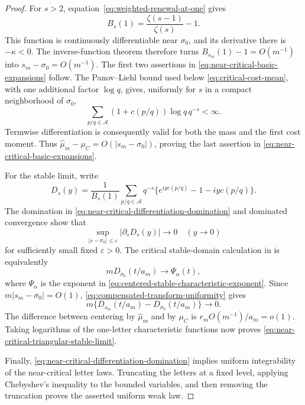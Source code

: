 \begin{proof}
For \(s>2\), equation~\eqref{eq:weighted-renewal-at-one} gives
\[
 B_s(1)=\frac{\zeta(s-1)}{\zeta(s)}-1.
\]
This function is continuously differentiable near \(\sigma_0\), and its
derivative there is \(-\kappa<0\).  The inverse-function theorem therefore
turns \(B_{s_m}(1)-1=O(m^{-1})\) into
\(s_m-\sigma_0=O(m^{-1})\).  The first two assertions in
\eqref{eq:near-critical-basic-expansions} follow.  The Panov--Liehl bound
used below \eqref{eq:critical-cost-mean}, with one additional factor
\(\log q\), gives, uniformly for \(s\) in a compact neighborhood of
\(\sigma_0\),
\begin{equation}
 \sum_{p/q\in\mathcal A}
 (1+c(p/q))\log q\,q^{-s}<\infty.
 \label{eq:near-critical-differentiation-domination}
\end{equation}
Termwise differentiation is consequently valid for both the mass and the
first cost moment.  Thus \(\widehat\mu_m-\mu_C=O(|s_m-\sigma_0|)\), proving
the last assertion in \eqref{eq:near-critical-basic-expansions}.

For the stable limit, write
\[
 D_s(y)=\frac1{B_s(1)}
 \sum_{p/q\in\mathcal A}q^{-s}
 \{e^{iyc(p/q)}-1-iyc(p/q)\}.
\]
The domination in \eqref{eq:near-critical-differentiation-domination} and
dominated convergence show that
\begin{equation}
 \sup_{|s-\sigma_0|\le\varepsilon}
 |\partial_sD_s(y)|\longrightarrow0
 \quad (y\to0)
 \label{eq:compensated-transform-uniformity}
\end{equation}
for sufficiently small fixed \(\varepsilon>0\).  The critical stable-domain
calculation in  is equivalently
\[
 mD_{\sigma_0}(t/a_m)\longrightarrow\Psi_\alpha(t),
\]
where \(\Psi_\alpha\) is the exponent in
\eqref{eq:centered-stable-characteristic-exponent}.  Since
\(m|s_m-\sigma_0|=O(1)\),
\eqref{eq:compensated-transform-uniformity} gives
\[
 m\{D_{s_m}(t/a_m)-D_{\sigma_0}(t/a_m)\}\longrightarrow0.
\]
The difference between centering by \(\widehat\mu_m\) and by \(\mu_C\) is
\(r_mO(m^{-1})/a_m=o(1)\).  Taking logarithms of the one-letter
characteristic functions now proves
\eqref{eq:near-critical-triangular-stable-limit}.

Finally, \eqref{eq:near-critical-differentiation-domination} implies uniform
integrability of the near-critical letter laws.  Truncating the letters at
a fixed level, applying Chebyshev's inequality to the bounded variables,
and then removing the truncation proves the asserted uniform weak law.
\end{proof}

